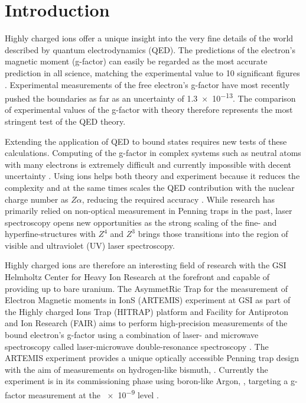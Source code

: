 \chapter{Introduction}
Highly charged ions offer a unique insight into the very fine details of the world described by quantum electrodynamics (QED). The predictions of the electron’s magnetic moment (g-factor) can easily be regarded as the most accurate prediction in all science, matching the experimental value to \num{10} significant figures \cite{gfactor_theory}. Experimental measurements of the free electron's g-factor have most recently pushed the boundaries as far as an uncertainty of \num{1.3e-13}. The comparison of experimental values of the g-factor with theory therefore represents the most stringent test of the QED theory.

Extending the application of QED to bound states requires new tests of these calculations. Computing of the g-factor in complex systems such as neutral atoms with many electrons is extremely difficult and currently impossible with decent uncertainty \cite{gfactor_theory_codegen}. Using ions helps both theory and experiment because it reduces the complexity and at the same times scales the QED contribution with the nuclear charge number as $Z\alpha$, reducing the required accuracy \cite{gfactor_ions_scaling}. While research has primarily relied on non-optical measurement in Penning traps in the past, laser spectroscopy opens new opportunities \cite{penning_trap_laser_spectroscopy} as the strong scaling of the fine- and hyperfine-structures with $Z^4$ and $Z^3$ brings those transitions into the region of visible and ultraviolet (UV) laser spectroscopy.

Highly charged ions are therefore an interesting field of research with the GSI Helmholtz Center for Heavy Ion Research at the forefront and capable of providing up to bare uranium. The AsymmetRic Trap for the measurement of Electron Magnetic moments in IonS (ARTEMIS) experiment at GSI as part of the Highly charged Ions Trap (HITRAP) platform and Facility for Antiproton and Ion Research (FAIR) aims to perform high-precision measurements of the bound electron's g-factor using a combination of laser- and microwave spectroscopy called laser-microwave double-resonance spectroscopy \cite{laser_microwave_double_resonance_spectroscopy}. The ARTEMIS experiment provides a unique optically accessible Penning trap design \cite{penning_trap_transparent,penning_trap_half_open} with the aim of measurements on hydrogen-like bismuth, . Currently the experiment is in its commissioning phase using boron-like Argon, , targeting a g-factor measurement at the \num{e-9} level \cite{artemis_commissioning}.

